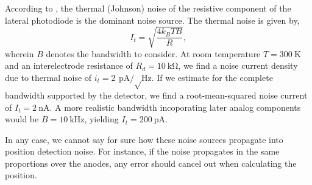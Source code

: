 According to \cite{Woltring75}, the thermal (Johnson) noise of the resistive component of the lateral photodiode is the dominant noise source.
The thermal noise is given by,
\begin{equation}
	I_t=\sqrt{\frac{4k_BTB}{R}},
\end{equation}
wherein $B$ denotes the bandwidth to consider.
At room temperature $T=\SI{300}{\kelvin}$ and an interelectrode resistance of $R_d=\SI{10}{\kilo\ohm}$, we find a noise current density due to thermal noise of $i_t=\SI{2}{\pico\ampere\per\sqrt\hertz}$.
If we estimate for the complete bandwidth supported by the detector, we find a root-mean-squared noise current of $I_t=\SI{2}{\nano\ampere}$.
A more realistic bandwidth incoporating later analog components would be $B=\SI{10}{\kilo\hertz}$, yielding $I_t=\SI{200}{\pico\ampere}$.

In any case, we cannot say for sure how these noise sources propagate into position detection noise.
For instance, if the noise propagates in the same proportions over the anodes, any error should cancel out when calculating the position.